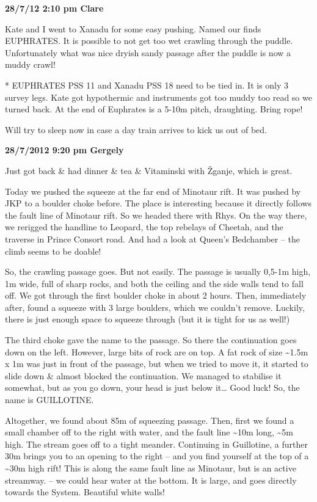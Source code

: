 \textbf{28/7/12 2:10 pm Clare}

Kate and I went to Xanadu for some easy pushing. Named our finds
EUPHRATES. It is possible to not get too wet crawling through the
puddle. Unfortunately what was nice dryish sandy passage after the
puddle is now a muddy crawl!

* EUPHRATES PSS 11 and Xanadu PSS 18 need to be tied in. It is only 3
survey legs. Kate got hypothermic and instruments got too muddy too read
so we turned back. At the end of Euphrates is a 5-10m pitch, draughting.
Bring rope!

Will try to sleep now in case a day train arrives to kick us out of bed.

\textbf{28/7/2012 9:20 pm Gergely}

Just got back \& had dinner \& tea \& Vitaminski with Žganje, which is
great.

Today we pushed the squeeze at the far end of Minotaur rift. It was
pushed by JKP to a boulder choke before. The place is interesting
because it directly follows the fault line of Minotaur rift. So we
headed there with Rhys. On the way there, we rerigged the handline to
Leopard, the top rebelays of Cheetah, and the traverse in Prince Consort
road. And had a look at Queen's Bedchamber -- the climb seems to be
doable!

So, the crawling passage goes. But not easily. The passage is usually
0,5-1m high, 1m wide, full of sharp rocks, and both the ceiling and the
side walls tend to fall off. We got through the first boulder choke in
about 2 hours. Then, immediately after, found a squeeze with 3 large
boulders, which we couldn't remove. Luckily, there is just enough space
to squeeze through (but it is tight for us as well!)

The third choke gave the name to the passage. So there the continuation
goes down on the left. However, large bits of rock are on top. A fat
rock of size \textasciitilde{}1.5m x 1m was just in front of the
passage, but when we tried to move it, it started to slide down \&
almost blocked the continuation. We managed to stabilise it somewhat,
but as you go down, your head is just below it\ldots{} Good luck! So,
the name is GUILLOTINE.

Altogether, we found about 85m of squeezing passage. Then, first we
found a small chamber off to the right with water, and the fault line
\textasciitilde{}10m long, \textasciitilde{}5m high. The stream goes off
to a tight meander. Continuing in Guillotine, a further 30m brings you
to an opening to the right -- and you find yourself at the top of a
\textasciitilde{}30m high rift! This is along the same fault line as
Minotaur, but is an active streamway. -- we could hear water at the
bottom. It is large, and goes directly towards the System. Beautiful
white walls!

